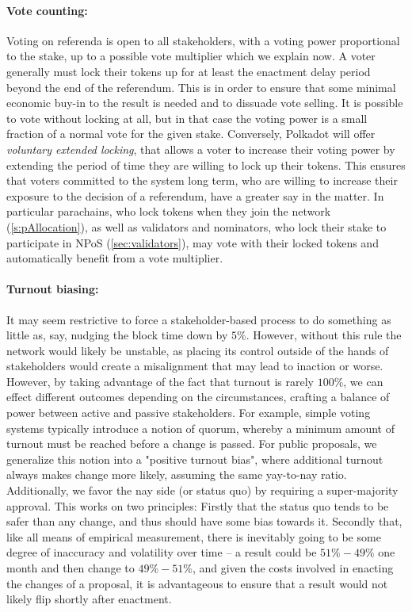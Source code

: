 \paragraph{Vote counting:} Voting on referenda is open to all stakeholders, with a voting power proportional to the stake, up to a possible vote multiplier which we explain now. A voter generally must lock their tokens up for at least the enactment delay period beyond the end of the referendum. This is in order to ensure that some minimal economic buy-in to the result is needed and to dissuade vote selling. It is possible to vote without locking at all, but in that case the voting power is a small fraction of a normal vote for the given stake. Conversely, Polkadot will offer \emph{voluntary extended locking}, that allows a voter to increase their voting power by extending the period of time they are willing to lock up their tokens. This ensures that voters committed to the system long term, who are willing to increase their exposure to the decision of a referendum, have a greater say in the matter. In particular parachains, who lock tokens when they join the network (\autoref{s:pAllocation}), as well as validators and nominators, who lock their stake to participate in NPoS (\autoref{sec:validators}), may vote with their locked tokens and automatically benefit from a vote multiplier.

\paragraph{Turnout biasing:} It may seem restrictive to force a stakeholder-based process to do something as little as, say, nudging the block time down by $5\%$. However, without this rule the network would likely be unstable, as placing its control outside of the hands of stakeholders would create a misalignment that may lead to inaction or worse. However, by taking advantage of the fact that turnout is rarely $100\%$, we can effect different outcomes depending on the circumstances, crafting a balance of power between active and passive stakeholders. For example, simple voting systems typically introduce a notion of quorum, whereby a minimum amount of turnout must be reached before a change is passed. For public proposals, we generalize this notion into a "positive turnout bias", where additional turnout always makes change more likely, assuming the same yay-to-nay ratio. Additionally, we favor the nay side (or status quo) by requiring a super-majority approval. This works on two principles: Firstly that the status quo tends to be safer than any change, and thus should have some bias towards it. Secondly that, like all means of empirical measurement, there is inevitably going to be some degree of inaccuracy and volatility over time -- a result could be $51\%-49\%$ one month and then change to $49\%-51\%$, and given the costs involved in enacting the changes of a proposal, it is advantageous to ensure that a result would not likely flip shortly after enactment. 

